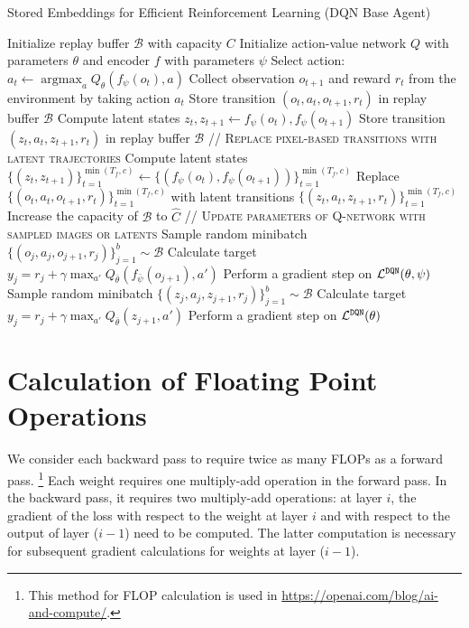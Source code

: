 \documentclass{article}
\DeclareMathOperator*{\argmax}{argmax}
\begin{document}
\begin{algorithm*}
\caption{Stored Embeddings for Efficient Reinforcement Learning (DQN Base Agent)}\label{euclid}
\begin{algorithmic}[1]
\State Initialize replay buffer $\mathcal{B}$ with capacity $C$
\State Initialize action-value network $Q$ with parameters $\theta$ and encoder $f$ with parameters $\psi$
    \State Select action: $a_t \leftarrow \argmax_a Q_\theta(f_\psi(o_t), a)$
    \State Collect observation $o_{t+1}$ and reward $r_t$ from the environment by taking action $a_t$
        \State Store transition $(o_t,a_t,o_{t+1},r_t)$ in replay buffer $\mathcal{B}$
    \Else
        \State Compute latent states $z_t, z_{t+1} \leftarrow f_\psi(o_t), f_\psi(o_{t+1})$
        \State Store transition $(z_t,a_t,z_{t+1},r_t)$ in replay buffer $\mathcal{B}$
    \EndIf
    \State \textsc{// Replace pixel-based transitions with latent trajectories}
        \State Compute latent states $\{(z_t, z_{t+1})\}_{t=1}^{\min(T_f, c)} \leftarrow \{(f_\psi(o_t), f_\psi(o_{t+1}))\}_{t=1}^{\min(T_f, c)}$
        \State Replace $\{(o_t,a_t, o_{t+1},r_t)\}_{t=1}^{\min(T_f, c)}$ with latent transitions $\{(z_t,a_t,z_{t+1},r_t)\}_{t=1}^{\min(T_f, c)}$
        \State Increase the capacity of $\mathcal{B}$ to $\widehat{C}$
    \EndIf
    \State \textsc{// Update parameters of Q-network with sampled images or latents}
            \State Sample random minibatch $\{(o_j,a_j,o_{j+1},r_j)\}_{j=1}^b\sim\mathcal{B}$
            \State Calculate target $y_j = r_j + \gamma \max_{a'} Q_{\bar{\theta}}(f_{\bar \psi}(o_{j+1}),a')$
            \State Perform a gradient step on $\mathcal{L}^{\tt DQN} (\theta, \psi)$
        \Else
            \State Sample random minibatch $\{(z_j,a_j,z_{j+1},r_j)\}_{j=1}^b\sim\mathcal{B}$
            \State Calculate target $y_j = r_j + \gamma \max_{a'} Q_{\bar{\theta}}(z_{j+1},a')$
            \State Perform a gradient step on $\mathcal{L}^{\tt DQN} (\theta)$
        \EndIf
    \EndFor
    
\EndFor
\item[]
\end{algorithmic} \label{lever_pseudocode}
\end{algorithm*} 

\section{Calculation of Floating Point Operations} \label{appendix:flop_counting}
We consider each backward pass to require twice as many FLOPs as a forward pass. \footnote{This method for FLOP calculation is used in \url{https://openai.com/blog/ai-and-compute/}.} Each weight requires one multiply-add operation in the forward pass. In the backward pass, it requires two multiply-add operations: at layer $i$, the gradient of the loss with respect to the weight at layer $i$ and with respect to the output of layer ($i-1$) need to be computed. The latter computation is necessary for subsequent gradient calculations for weights at layer ($i-1$). 
\end{document}
